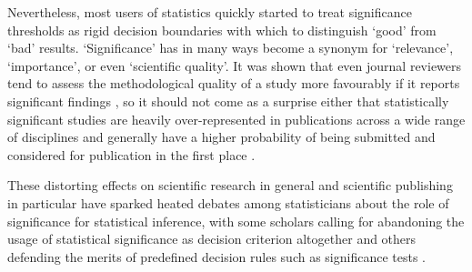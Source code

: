 Nevertheless, most users of statistics quickly started to treat significance thresholds as rigid decision boundaries with which to distinguish `good' from `bad' results. `Significance' has in many ways become a synonym for `relevance', `importance', or even `scientific quality'. It was shown that even journal reviewers tend to assess the methodological quality of a study more favourably if it reports significant findings \citep{mahoney_publication_1977}, so it should not come as a surprise either that statistically significant studies are heavily over-represented in publications across a wide range of disciplines and generally have a higher probability of being submitted and considered for publication in the first place \citep{hedges_estimation_1984, begg_publication_1988, dickersin_existence_1990, easterbrook_publication_1991, cooper_finding_1997, gerber_testing_2001, dickersin_publication_2005, gerber_can_2006, ioannidis_exploratory_2007, gerber_publication_2008, weiss_identification_2011, fanelli_negative_2012, franco_publication_2014, kuhberger_publication_2014, flint_there_2015, berning_publication_2016}.\par
These distorting effects on scientific research in general and scientific publishing in particular have sparked heated debates among statisticians about the role of significance for statistical inference, with some scholars calling for abandoning the  usage  of  statistical significance as decision criterion altogether \citep{mcshane_abandon_2019, amrhein_retire_2019} and others defending the merits of predefined decision rules such as significance tests \citep{ioannidis_importance_2019}.

